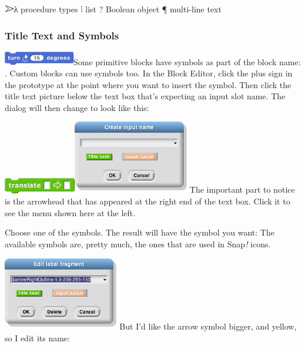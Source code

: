 \includegraphics[width=0.16319in,height=0.13542in]{media/image686.png}λ
procedure types ⫶ list ? Boolean object ¶ multi-line text

\subsubsection{Title Text and Symbols}\label{title-text-and-symbols}

\includegraphics[width=1.21875in,height=0.23472in]{media/image687.png}Some
primitive blocks have symbols as part of the block name: . Custom blocks
can use symbols too. In the Block Editor, click the plus sign in the
prototype at the point where you want to insert the symbol. Then click
the title text picture below the text box that's expecting an input slot
name. The dialog will then change to look like this:

\includegraphics[width=1.24444in,height=0.26667in]{media/image688.png}\includegraphics[width=2.03472in,height=1.26389in]{media/image689.png}The
important part to notice is the arrowhead that has appeared at the right
end of the text box. Click it to see the menu shown here at the left.

Choose one of the symbols. The result will have the symbol you want: The
available symbols are, pretty much, the ones that are used in
Snap\emph{!} icons.

\includegraphics[width=2.03472in,height=1.26389in]{media/image690.png}But
I'd like the arrow symbol bigger, and yellow, so I edit its name:

